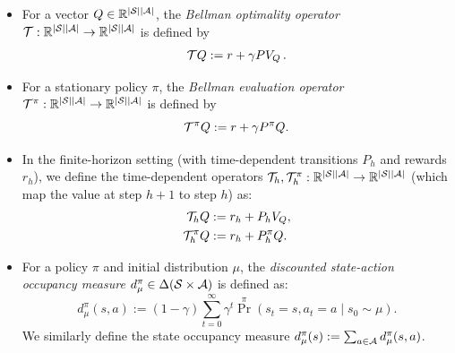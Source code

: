 \begin{itemize}
\item For a vector $Q \in \mathbb{R}^{|\mathcal{S}||\mathcal{A}|}$, the \emph{Bellman optimality operator}
  $\mathcal{T}: \mathbb{R}^{|\mathcal{S}||\mathcal{A}|} \to \mathbb{R}^{|\mathcal{S}||\mathcal{A}|}$ is defined by
\begin{align}
\mathcal{T} Q := r + \gamma P V_Q \, .
\end{align}

\item For a stationary policy $\pi$, the \emph{Bellman evaluation operator}
  $\mathcal{T}^\pi: \mathbb{R}^{|\mathcal{S}||\mathcal{A}|} \to \mathbb{R}^{|\mathcal{S}||\mathcal{A}|}$ is defined by
  \[
  \mathcal{T}^\pi Q := r + \gamma P^\pi Q.
  \]

\item In the finite-horizon setting (with time-dependent transitions $P_h$ and rewards $r_h$),
  we define the time-dependent operators $\mathcal{T}_h, \mathcal{T}_h^\pi: \mathbb{R}^{|\mathcal{S}||\mathcal{A}|} \to \mathbb{R}^{|\mathcal{S}||\mathcal{A}|}$
  (which map the value at step $h+1$ to step $h$) as:
  \begin{align*}
  \mathcal{T}_h Q &:= r_h + P_h V_Q, \\
  \mathcal{T}_h^\pi Q &:= r_h + P_h^\pi Q.
  \end{align*}

\item For a policy $\pi$ and initial distribution $\mu$, the \emph{discounted state-action occupancy measure} $d_\mu^\pi \in \Delta(\mathcal{S}\times\mathcal{A})$ is defined as:
\[
d_\mu^\pi(s,a) := (1-\gamma)\sum_{t=0}^\infty \gamma^t {\Pr}^\pi(s_t=s, a_t=a \mid s_0 \sim \mu).
\]
We similarly define the state occupancy measure $d_\mu^\pi(s) := \sum_{a\in\mathcal{A}} d_\mu^\pi(s,a)$.
  
\end{itemize}